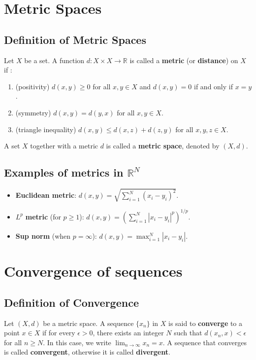 \section{Metric Spaces}
\subsection{Definition of Metric Spaces}
\begin{definition}
    Let $X$ be a set. A function $d: X \times X \rightarrow \mathbb{R}$ is called a \textbf{metric} (or \textbf{distance}) on $X$ if :
    \begin{enumerate}
        \item (positivity) $d(x,y) \geq 0$ for all $x,y \in X$ and $d(x,y) = 0$ if and only if $x = y$.
        \item (symmetry) $d(x,y) = d(y,x)$ for all $x,y \in X$.
        \item (triangle inequality) $d(x,y) \leq d(x,z) + d(z,y)$ for all $x,y,z \in X$.
    \end{enumerate}
\end{definition}
A set $X$ together with a metric $d$ is called a \textbf{metric space}, denoted by $(X,d)$.

\subsection{Examples of metrics in $\mathbb{R}^N$}
\begin{itemize}
    \item \textbf{ Euclidean metric}: $d(x,y) = \sqrt{\sum_{i=1}^{N} (x_i - y_i)^2}$.
    \item $L^p$ \textbf{metric} (for $p\ge 1$): $d(x,y) = (\sum_{i=1}^{N} |x_i - y_i|^p)^{1/p}$.
    \item \textbf{Sup norm} (when $p=\infty$): $d(x,y) = \max_{i=1}^{N} |x_i - y_i|$.
\end{itemize}

\section{Convergence of sequences}
\subsection{Definition of Convergence}
\begin{definition}
    Let $(X,d)$ be a metric space. A sequence $\{x_n\}$ in $X$ is said to \textbf{converge} to a point $x \in X$ if for every $\epsilon > 0$, there exists an integer $N$ such that $d(x_n,x) < \epsilon$ for all $n \geq N$. In this case, we write $\lim_{n \rightarrow \infty} x_n = x$. A sequence that converges is called \textbf{convergent}, otherwise it is called \textbf{divergent}.
\end{definition}

